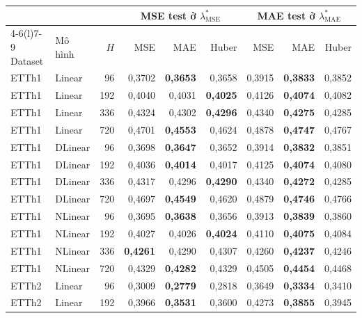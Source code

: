 \begin{longtable}{@{}llr rrr rrr@{}}
\toprule
 & & & \multicolumn{3}{c}{MSE test ở $\lambda^*_{\mathrm{MSE}}$} & \multicolumn{3}{c}{MAE test ở $\lambda^*_{\mathrm{MAE}}$} \\
\cmidrule(lr){4-6}\cmidrule(l){7-9}
Dataset & Mô hình & $H$ & MSE & MAE & Huber & MSE & MAE & Huber \\
\midrule
\endhead
ETTh1 & Linear & 96 & 0{,}3702 & \textbf{0{,}3653} & 0{,}3658 & 0{,}3915 & \textbf{0{,}3833} & 0{,}3852 \\
ETTh1 & Linear & 192 & 0{,}4040 & 0{,}4031 & \textbf{0{,}4025} & 0{,}4126 & \textbf{0{,}4074} & 0{,}4082 \\
ETTh1 & Linear & 336 & 0{,}4324 & 0{,}4302 & \textbf{0{,}4296} & 0{,}4340 & \textbf{0{,}4275} & 0{,}4285 \\
ETTh1 & Linear & 720 & 0{,}4701 & \textbf{0{,}4553} & 0{,}4624 & 0{,}4878 & \textbf{0{,}4747} & 0{,}4767 \\
\addlinespace[2pt]
ETTh1 & DLinear & 96 & 0{,}3698 & \textbf{0{,}3647} & 0{,}3652 & 0{,}3914 & \textbf{0{,}3832} & 0{,}3851 \\
ETTh1 & DLinear & 192 & 0{,}4036 & \textbf{0{,}4014} & 0{,}4017 & 0{,}4125 & \textbf{0{,}4074} & 0{,}4080 \\
ETTh1 & DLinear & 336 & 0{,}4317 & 0{,}4296 & \textbf{0{,}4290} & 0{,}4340 & \textbf{0{,}4272} & 0{,}4285 \\
ETTh1 & DLinear & 720 & 0{,}4697 & \textbf{0{,}4549} & 0{,}4620 & 0{,}4879 & \textbf{0{,}4746} & 0{,}4766 \\
\addlinespace[2pt]
ETTh1 & NLinear & 96 & 0{,}3695 & \textbf{0{,}3638} & 0{,}3656 & 0{,}3913 & \textbf{0{,}3839} & 0{,}3860 \\
ETTh1 & NLinear & 192 & 0{,}4027 & 0{,}4026 & \textbf{0{,}4024} & 0{,}4110 & \textbf{0{,}4075} & 0{,}4084 \\
ETTh1 & NLinear & 336 & \textbf{0{,}4261} & 0{,}4290 & 0{,}4307 & 0{,}4260 & \textbf{0{,}4237} & 0{,}4246 \\
ETTh1 & NLinear & 720 & 0{,}4329 & \textbf{0{,}4282} & 0{,}4329 & 0{,}4505 & \textbf{0{,}4454} & 0{,}4468 \\
\addlinespace[2pt]
\midrule
ETTh2 & Linear & 96 & 0{,}3009 & \textbf{0{,}2779} & 0{,}2818 & 0{,}3649 & \textbf{0{,}3334} & 0{,}3410 \\
ETTh2 & Linear & 192 & 0{,}3966 & \textbf{0{,}3531} & 0{,}3600 & 0{,}4273 & \textbf{0{,}3855} & 0{,}3945 \\

\end{longtable}
